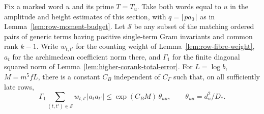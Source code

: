 \begin{auxlemma}\label{lem:equal-word-generic-corank-one}
Fix a marked word \(u\) and its prime \(T=T_u\). Take both words
equal to \(u\) in the amplitude and height estimates of this
section, with \(q=\lceil p a_0\rceil\) as in
Lemma~\ref{lem:row-moment-budget}. Let \(\mathcal S\) be any subset
of the matching ordered pairs of generic terms having positive
single-term Gram invariants and common rank \(k-1\). Write
\(w_{t,t'}\) for the counting weight of Lemma~\ref{lem:row-fibre-weight},
\(a_t\) for the archimedean coefficient norm there, and \(\Gamma_1\)
for the finite diagonal squared norm of Lemma~\ref{lem:higher-corank-total-error}.
For \(L=\log b\), \(M=m^5fL\), there is a constant \(C_B\)
independent of \(C_\Gamma\) such that, on all sufficiently late rows,
\begin{equation}\label{eq:equal-word-generic-corank-one}
 \Gamma_1\sum_{(t,t')\in\mathcal S} w_{t,t'}|a_ta_{t'}|
             \le \exp(C_B M)\,\theta_{uu},
 \qquad \theta_{uu}=d_u^2/D_* .
\end{equation}
\end{auxlemma}
